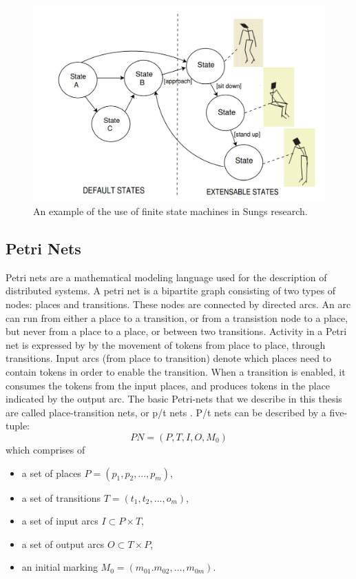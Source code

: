 \documentclass[11pt, a4paper]{book}
\begin{document}
\begin{figure}[h]
\centering
\includegraphics[width=.6\textwidth]{./statemachine_situations.png}
\caption{An example of the use of finite state machines in Sungs research.}
\label{fig:sungstatemachine}
\end{figure}


\subsection{Petri Nets}
Petri nets are a mathematical modeling language used for the description of distributed systems. A petri net is a bipartite graph consisting of two types of nodes: places and transitions. These nodes are connected by directed arcs. An arc can run from either a place to a transition, or from a transistion node to a place, but never from a place to a place, or between two transitions. Activity in a Petri net is expressed by by the movement of tokens from place to place, through transitions. Input arcs (from place to transition) denote which places need to contain tokens in order to enable the transition. When a transition is enabled, it consumes the tokens from the input places, and produces tokens in the place indicated by the output arc. The basic Petri-nets that we describe in this thesis are called place-transition nets, or p/t nets \cite{desel1998place}.
P/t nets can be described by a five-tuple:
\begin{equation}
PN = (P,T,I,O,M_0)
\end{equation}
which comprises of
\begin{itemize}
\item a set of places $P = (p_1, p_2, ..., p_m)$,
\item a set of transitions $T = (t_1, t_2, ...,o_m)$,
\item a set of input arcs $I \subset P \times T$,
\item a set of output arcs $O \subset T \times P$,
\item an initial marking $M_0 = (m_{01}. m_{02}, \ldots, m_{0m})$.
\end{itemize}
\end{document}

